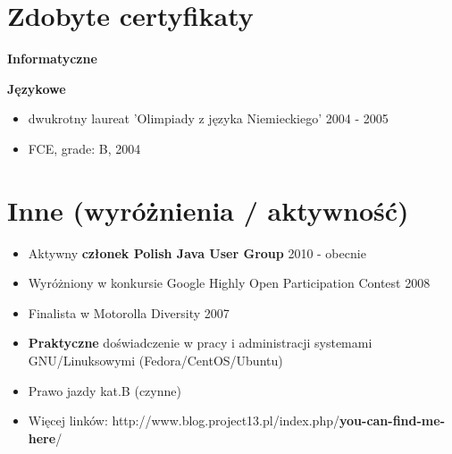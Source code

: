 \documentclass{res}
\begin{document}
\begin{resume}
\section{Zdobyte certyfikaty} 
{\bf Informatyczne}
{\bf Językowe}
\begin{itemize}
 \item dwukrotny laureat 'Olimpiady z języka Niemieckiego' \hfill 2004 - 2005
 \item FCE, grade: B, \hfill 2004
\end{itemize}

\section{Inne (wyróżnienia / aktywność)} 
\begin{itemize}
 \item Aktywny \textbf{członek Polish Java User Group} \hfill 2010 - obecnie
 \item Wyróżniony w konkursie Google Highly Open Participation Contest \hfill 2008
 \item Finalista w Motorolla Diversity \hfill 2007
 \item \textbf{Praktyczne} doświadczenie w pracy i administracji systemami GNU/Linuksowymi (Fedora/CentOS/Ubuntu)
 \item Prawo jazdy kat.B (czynne)
 \item Więcej linków: http://www.blog.project13.pl/index.php/\textbf{you-can-find-me-here}/
\end{itemize}

 


\end{resume}
\end{document}
